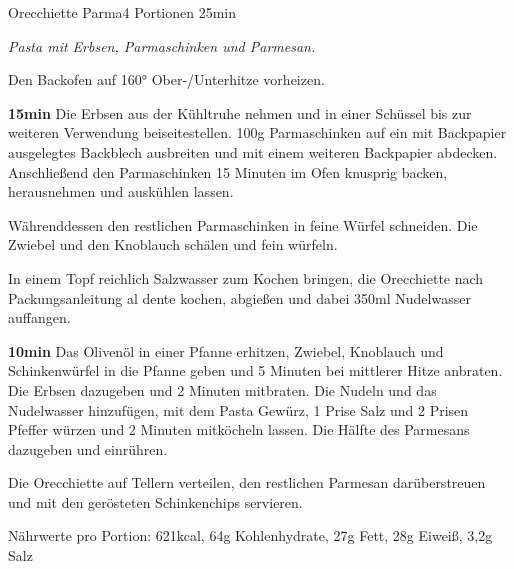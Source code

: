 \documentclass[../recipe-collections/cooking.tex]{subfiles}
\begin{document}
\begin{recipe}{Orecchiette Parma}{4 Portionen }{25min }

  \freeform{}\textit{Pasta mit Erbsen, Parmaschinken und Parmesan.}

  \newstep{}Den Backofen auf 160° Ober-/Unterhitze vorheizen.


  \textbf{15min}
  Die Erbsen aus der Kühltruhe nehmen und in einer Schüssel bis zur weiteren Verwendung beiseitestellen.
  100g Parmaschinken auf ein mit Backpapier ausgelegtes Backblech ausbreiten und mit einem weiteren Backpapier abdecken.
  Anschließend den Parmaschinken 15 Minuten im Ofen knusprig backen, herausnehmen und auskühlen lassen.


  Währenddessen den restlichen Parmaschinken in feine Würfel schneiden.
  Die Zwiebel und den Knoblauch schälen und fein würfeln.


  In einem Topf reichlich Salzwasser zum Kochen bringen, die Orecchiette nach Packungsanleitung al dente kochen, abgießen und dabei 350ml Nudelwasser auffangen.


  \textbf{10min}
  Das Olivenöl in einer Pfanne erhitzen, Zwiebel, Knoblauch und Schinkenwürfel in die Pfanne geben und 5 Minuten bei mittlerer Hitze anbraten.
  Die Erbsen dazugeben und 2 Minuten mitbraten.
  Die Nudeln und das Nudelwasser hinzufügen, mit dem Pasta Gewürz, 1 Prise Salz und 2 Prisen Pfeffer würzen und 2 Minuten mitköcheln lassen.
  Die Hälfte des Parmesans dazugeben und einrühren.

  \newstep{}Die Orecchiette auf Tellern verteilen, den restlichen Parmesan darüberstreuen und mit den gerösteten Schinkenchips servieren.

  \freeform{}\hrulefill{}

  \freeform{}
  Nährwerte pro Portion: 621kcal, 64g Kohlenhydrate, 27g Fett, 28g Eiweiß, 3,2g Salz

\end{recipe}
\end{document}
